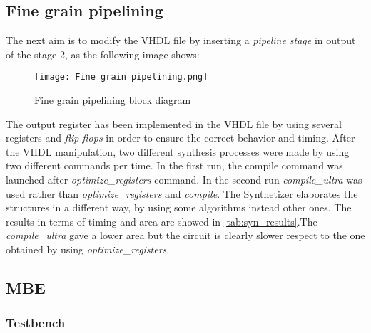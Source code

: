 \subsection{Fine grain pipelining}
The next aim is to modify the VHDL file by inserting a \textit{pipeline stage} in output of the stage 2, as the following image shows:
\begin{figure}[H]
	\center
	\texttt{[image: Fine grain pipelining.png]}
	\caption{Fine grain pipelining block diagram}
	\label{fig:mult_struct}
\end{figure}
The output register has been implemented in the VHDL file by using several registers and \textit{flip-flops} in order to ensure the correct behavior and timing.  After the VHDL manipulation, two different synthesis processes were made by using two different commands per time. In the first run, the compile command was launched after \textit{optimize\_registers} command. In the second run  \textit{compile\_ultra} was used rather than \textit{optimize\_registers} and \textit{compile}. The Synthetizer elaborates the structures in a different way, by using some algorithms instead other ones. The results in terms of timing and area are showed in \autoref{tab:syn_results}.The \textit{compile\_ultra} gave a lower area but the circuit is clearly slower respect to the one obtained by using \textit{optimize\_registers}.
\subsection{MBE}
\subsubsection{Testbench}
